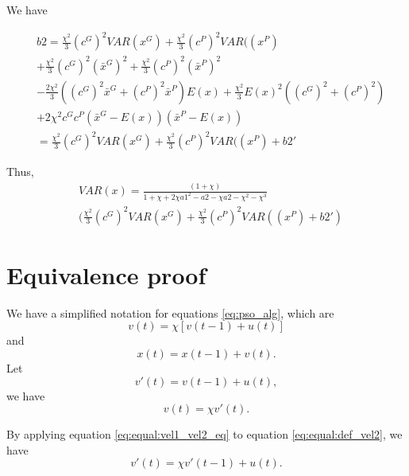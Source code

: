 \documentclass[12pt]{article}
\begin{document}
We have

\begin{equation}
\label{eq:b_t_2_mean2}
\begin{aligned}
& b2 = 
\frac{\chi^{2}}{3} (c^{G})^{2} VAR( x^{G} )  + \frac{\chi^{2}}{3} (c^{P})^{2} VAR( (x^{P} )  \\
& + \frac{\chi^{2}}{3} (c^{G})^{2} (\bar{x}^{G})^{2} 
+ \frac{\chi^{2}}{3} (c^{P})^{2} (\bar{x}^{P})^{2}  \\
& - \frac{2 \chi^{2} }{3} ( (c^{G})^{2} \bar{x}^{G} + (c^{P})^{2} \bar{x}^{P} ) E(x)  + \frac{\chi^{2}}{3} E(x)^{2} ( (c^{G})^{2} + (c^{P})^{2} ) \\
& + 2 \chi^{2} c^{G} c^{P} ( \bar{x}^{G} - E(x) ) ( \bar{x}^{P} - E(x) ) \\
& = \frac{\chi^{2}}{3} (c^{G})^{2} VAR( x^{G} )  + \frac{\chi^{2}}{3} (c^{P})^{2} VAR( (x^{P} ) + b2'
\end{aligned}
\end{equation}

Thus,
\begin{equation}
\label{eq:var_equilirium2}
\begin{aligned}
& VAR(x) = \frac{ (1+\chi)  }{ 1 + \chi + 2 \chi {a1}^{2} - a2 - \chi a2  - \chi^{2} - \chi^{3}  } \\
& ( \frac{\chi^{2}}{3} (c^{G})^{2} VAR( x^{G} )  + \frac{\chi^{2}}{3} (c^{P})^{2} VAR( (x^{P} ) + b2'  )
\end{aligned}
\end{equation}

\section{Equivalence proof}

We have a simplified notation for equations \eqref{eq:pso_alg}, which are
\begin{equation}
\label{eq:equal:vel_up1}
v(t) = \chi [ v(t-1) + u(t) ]
\end{equation}
and 
\begin{equation}
\label{eq:equal:pos_up1}
x(t) = x(t-1) + v(t).
\end{equation}
Let 
\begin{equation}
\label{eq:equal:def_vel2}
v'(t) = v(t-1) + u(t),
\end{equation}
we have
\begin{equation}
\label{eq:equal:vel1_vel2_eq}
v(t) = \chi v'(t).
\end{equation}

By applying equation \eqref{eq:equal:vel1_vel2_eq} to equation \eqref{eq:equal:def_vel2}, we have
\begin{equation}
v'(t) = \chi v'(t-1) + u(t).
\end{equation}
\end{document}
